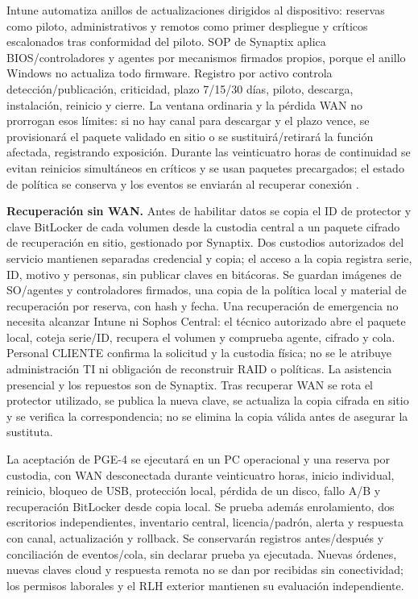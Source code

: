 Intune automatiza anillos de actualizaciones dirigidos al dispositivo: reservas como piloto, administrativos y remotos como primer despliegue y críticos escalonados tras conformidad del piloto. SOP de Synaptix aplica BIOS/controladores y agentes por mecanismos firmados propios, porque el anillo Windows no actualiza todo firmware. Registro por activo controla detección/publicación, criticidad, plazo 7/15/30 días, piloto, descarga, instalación, reinicio y cierre. La ventana ordinaria y la pérdida WAN no prorrogan esos límites: si no hay canal para descargar y el plazo vence, se provisionará el paquete validado en sitio o se sustituirá/retirará la función afectada, registrando exposición. Durante las veinticuatro horas de continuidad se evitan reinicios simultáneos en críticos y se usan paquetes precargados; el estado de política se conserva y los eventos se enviarán al recuperar conexión \parencites{p4-intune-actualizaciones}[RT-11.04]{pucv-transversal}.

\textbf{Recuperación sin WAN.} Antes de habilitar datos se copia el ID de protector y clave BitLocker de cada volumen desde la custodia central a un paquete cifrado de recuperación en sitio, gestionado por Synaptix. Dos custodios autorizados del servicio mantienen separadas credencial y copia; el acceso a la copia registra serie, ID, motivo y personas, sin publicar claves en bitácoras. Se guardan imágenes de SO/agentes y controladores firmados, una copia de la política local y material de recuperación por reserva, con hash y fecha. Una recuperación de emergencia no necesita alcanzar Intune ni Sophos Central: el técnico autorizado abre el paquete local, coteja serie/ID, recupera el volumen y comprueba agente, cifrado y cola. Personal CLIENTE confirma la solicitud y la custodia física; no se le atribuye administración TI ni obligación de reconstruir RAID o políticas. La asistencia presencial y los repuestos son de Synaptix. Tras recuperar WAN se rota el protector utilizado, se publica la nueva clave, se actualiza la copia cifrada en sitio y se verifica la correspondencia; no se elimina la copia válida antes de asegurar la sustituta.

La aceptación de PGE-4 se ejecutará en un PC operacional y una reserva por custodia, con WAN desconectada durante veinticuatro horas, inicio individual, reinicio, bloqueo de USB, protección local, pérdida de un disco, fallo A/B y recuperación BitLocker desde copia local. Se prueba además enrolamiento, dos escritorios independientes, inventario central, licencia/padrón, alerta y respuesta con canal, actualización y rollback. Se conservarán registros antes/después y conciliación de eventos/cola, sin declarar prueba ya ejecutada. Nuevas órdenes, nuevas claves cloud y respuesta remota no se dan por recibidas sin conectividad; los permisos laborales y el RLH exterior mantienen su evaluación independiente.
